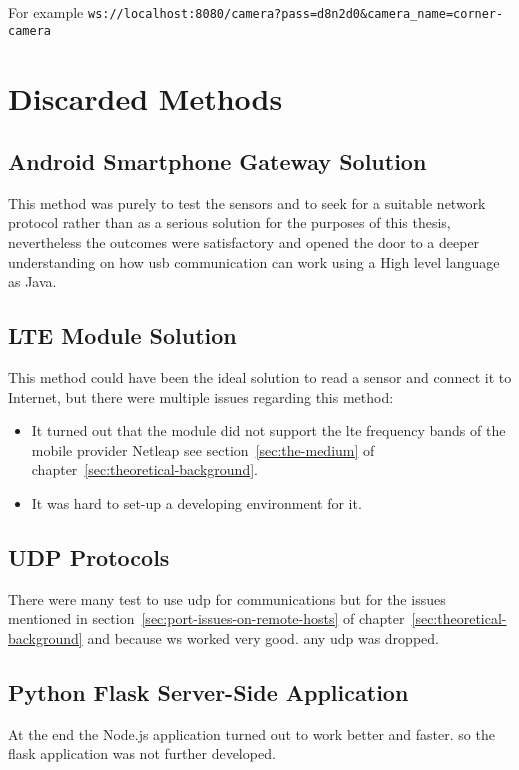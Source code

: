 \documentclass[hidelinks,11pt,a4paper,oneside,article]{memoir}
\begin{document}
For example \texttt{ws://localhost:8080/camera?pass=d8n2d0\&camera\_name=corner-camera}

\section{Discarded Methods}

\subsection*{Android Smartphone Gateway Solution}
This method was purely to test the sensors and to seek for a suitable network protocol rather than as a serious solution for the purposes of this thesis, nevertheless the outcomes were satisfactory and opened the door to a deeper understanding on how \gls{usb} communication can work using a High level language as Java.

\subsection*{LTE Module Solution}
This method could have been the ideal solution to read a sensor and connect it to Internet, but there were multiple issues regarding this method:
\begin{itemize}
    \item It turned out that the module did not support the \gls{lte} frequency bands of the mobile provider Netleap see section~\ref{sec:the-medium} of chapter~\ref{sec:theoretical-background}.
    \item It was hard to set-up a developing environment for it.
\end{itemize} 

\subsection*{UDP Protocols}
There were many test to use \gls{udp} for communications but for the issues mentioned in section~\ref{sec:port-issues-on-remote-hosts} of chapter~\ref{sec:theoretical-background} and because \gls{ws} worked very good. any \gls{udp} was dropped.

\subsection*{Python Flask Server-Side Application}
At the end the Node.js application turned out to work better and faster. so the flask application was not further developed.
\end{document}
